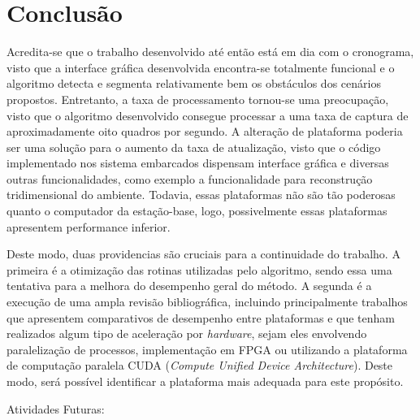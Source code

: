 \chapter{Conclusão}
\label{Conclusao}

Acredita-se que o trabalho desenvolvido até então está em dia com o cronograma, visto que a interface gráfica desenvolvida encontra-se totalmente funcional e o algoritmo detecta e segmenta relativamente bem os obstáculos dos cenários propostos. Entretanto, a taxa de processamento tornou-se uma preocupação, visto que o algoritmo desenvolvido consegue processar a uma taxa de captura de aproximadamente oito quadros por segundo. A alteração de plataforma poderia ser uma solução para o aumento da taxa de atualização, visto que o código implementado nos sistema embarcados dispensam interface gráfica e diversas outras funcionalidades, como exemplo a funcionalidade para reconstrução tridimensional do ambiente. Todavia, essas plataformas não são tão poderosas quanto o computador da estação-base, logo, possivelmente essas plataformas apresentem performance inferior.

Deste modo, duas providencias  são cruciais para a continuidade do trabalho. A primeira é a otimização das rotinas utilizadas pelo algoritmo, sendo essa uma tentativa para a melhora do desempenho geral do método. A segunda é a execução de uma ampla revisão bibliográfica, incluindo principalmente trabalhos que apresentem comparativos de desempenho entre plataformas e que tenham realizados algum tipo de aceleração por \textit{hardware}, sejam eles envolvendo paralelização de processos, implementação em FPGA ou utilizando a plataforma de computação paralela CUDA (\textit{Compute Unified Device Architecture}). Deste modo, será possível identificar a plataforma mais adequada para este propósito. 

Atividades Futuras:

